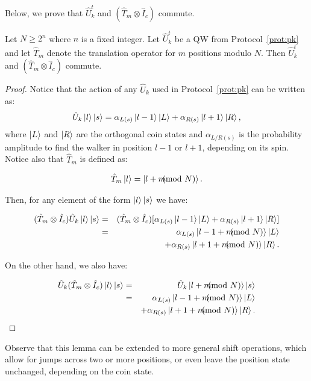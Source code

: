 Below, we prove that $\hat{U}_k^t$ and $(\hat{T}_m \otimes \hat{I}_c)$ commute. 

\begin{lemma}
Let $N\geq 2^n$ where $n$ is a fixed integer. 
Let $\hat{U}_k^t$ be a QW from Protocol~\ref{prot:pk} and let $\hat{T}_m$ denote the translation operator for $m$ positions modulo $N$. Then $\hat{U}_k^t$ and $(\hat{T}_m\otimes \hat{I}_c)$ commute.
\end{lemma}

\begin{proof}
Notice that the action of any $\hat U_k$ used in Protocol~\ref{prot:pk} can be written as:
\begin{eqnarray}
\hat U_k\Ket{l}\Ket{s} = \alpha_{L(s)} \Ket{l-1} \Ket{L} +\alpha_{R(s)} \Ket{l+1} \Ket{R},
\end{eqnarray}
where $\Ket{L}$ and $\Ket{R}$ are the orthogonal coin states and 
$\alpha_{L/R(s)}$ is the probability amplitude to find the walker in position $l-1$ or $l+1$, depending on its spin.
Notice also that $\hat{T}_m$ is defined as:

\begin{eqnarray}
\hat{T}_m \Ket{l} = \Ket{l+m \!\!\!\!\!\pmod N}.
\end{eqnarray}

Then, for any element of the form $\Ket{l}\Ket{s}$ we have:

\begin{eqnarray}
(\hat{T}_m\otimes \hat{I}_c) \hat{U}_k  \Ket{l}\Ket{s}
	&=&(\hat{T}_m\otimes \hat{I}_c) [ \alpha_{L(s)} \Ket{l-1} \Ket{L} + \alpha_{R(s)} \Ket{l+1}\Ket{R} ]\nonumber\\
	&=& \alpha_{L(s)} \Ket{l-1+ m  \ppmod N} \Ket{L}\\ && + \alpha_{R(s)} \Ket{l+1 + m  \ppmod N} \Ket{R}.\nonumber
\end{eqnarray}

On the other hand, we also have:

\begin{eqnarray}
	\hat{U}_k(\hat{T}_m\otimes \hat{I}_c) \Ket{l}\Ket{s}
		&=& \hat{U}_k \Ket{l + m  \ppmod N}\Ket{s}\nonumber\\
		&=& \alpha_{L(s)} \Ket{l-1+ m  \ppmod N} \Ket{L} \\ 
		& &+ \alpha_{R(s)} \Ket{l+1 + m  \ppmod N} \Ket{R}.\nonumber
\end{eqnarray}
\end{proof}
Observe that this lemma can be extended to more general shift operations, which allow for jumps across two or more positions, or even leave the position state unchanged, depending on the coin state. 



